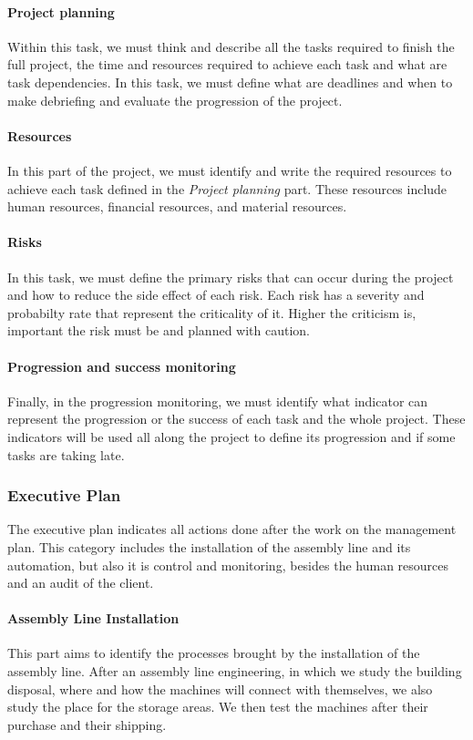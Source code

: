 \paragraph{Project planning} Within this task, we must think and describe all the tasks required to finish the full project, the time and resources required to achieve each task and what are task dependencies.
In this task, we must define what are deadlines and when to make debriefing and evaluate the progression of the project.

\paragraph{Resources} In this part of the project, we must identify and write the required resources to achieve each task defined in the \emph{Project planning} part.
These resources include human resources, financial resources, and material resources.

\paragraph{Risks} In this task, we must define the primary risks that can occur during the project and how to reduce the side effect of each risk.
Each risk has a severity and probabilty rate that represent the criticality of it.
Higher the criticism is, important the risk must be and planned with caution.

\paragraph{Progression and success monitoring} Finally, in the progression monitoring, we must identify what indicator can represent the progression or the success of each task and the whole project.
These indicators will be used all along the project to define its progression and if some tasks are taking late.

\subsubsection{Executive Plan}

The executive plan indicates all actions done after the work on the management plan. 
This category includes the installation of the assembly line and its automation, but also it is control and monitoring, besides the human resources and an audit of the client.

\paragraph{Assembly Line Installation} This part aims to identify the processes brought by the installation of the assembly line. 
After an assembly line engineering, in which we study the building disposal, where and how the machines will connect with themselves, we also
study the place for the storage areas. 
We then test the machines after their purchase and their shipping. 

